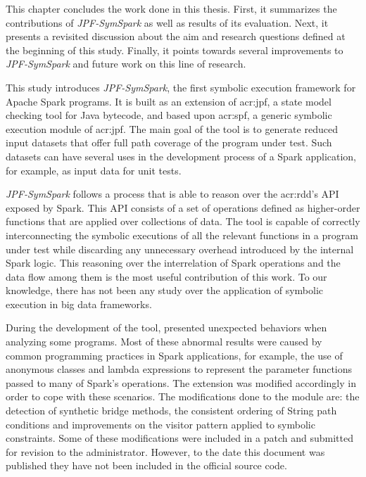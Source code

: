 
This chapter concludes the work done in this thesis. First, it summarizes the contributions of \textit{JPF-SymSpark} as well as results of its evaluation. Next, it presents a revisited discussion about the aim and research questions defined at the beginning of this study. Finally, it points towards several improvements to \textit{JPF-SymSpark} and future work on this line of research.


This study introduces \textit{JPF-SymSpark}, the first symbolic execution framework for Apache Spark programs. It is built as an extension of \acrfull{acr:jpf}, a state model checking tool for Java bytecode, and based upon \acrfull{acr:spf}, a generic symbolic execution module of \acrshort{acr:jpf}. The main goal of the tool is to generate reduced input datasets that offer full path coverage of the program under test. Such datasets can have several uses in the development process of a Spark application, for example, as input data for unit tests. 

\textit{JPF-SymSpark} follows a process that is able to reason over the \acrshort{acr:rdd}'s API exposed by Spark. This API consists of a set of operations defined as higher-order functions that are applied over collections of data. The tool is capable of correctly interconnecting the symbolic executions of all the relevant functions in a program under test while discarding any unnecessary overhead introduced by the internal Spark logic. This reasoning over the interrelation of Spark operations and the data flow among them is the most useful contribution of this work. To our knowledge, there has not been any study over the application of symbolic execution in big data frameworks.

During the development of the tool, \spf{} presented unexpected behaviors when analyzing some programs. Most of these abnormal results were caused by common programming practices in Spark applications, for example, the use of anonymous classes and lambda expressions to represent the parameter functions passed to many of Spark's operations. The \spf{} extension was modified accordingly in order to cope with these scenarios. The modifications done to the \spf{} module are: the detection of synthetic bridge methods, the consistent ordering of String path conditions and improvements on the visitor pattern applied to symbolic constraints. Some of these modifications were included in a patch and submitted for revision to the \spf{} administrator. However, to the date this document was published they have not been included in the official source code.

